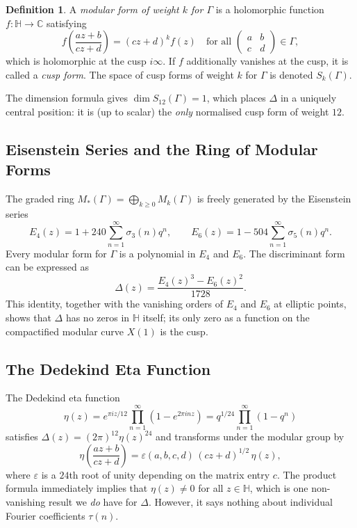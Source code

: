 \documentclass[12pt,a4paper]{amsart}
\theoremstyle{definition}
\newtheorem{definition}[theorem]{Definition}
\begin{document}
\begin{definition}
A \emph{modular form of weight $k$ for $\Gamma$} is a holomorphic function
$f : \mathbb{H} \to \mathbb{C}$ satisfying
\[
  f\!\left(\frac{az+b}{cz+d}\right) = (cz+d)^k f(z)
  \quad \text{for all } \begin{pmatrix}a&b\\c&d\end{pmatrix} \in \Gamma,
\]
which is holomorphic at the cusp $i\infty$. If $f$ additionally vanishes at the
cusp, it is called a \emph{cusp form}. The space of cusp forms of weight $k$ for
$\Gamma$ is denoted $S_k(\Gamma)$.
\end{definition}

The dimension formula gives $\dim S_{12}(\Gamma) = 1$, which places $\Delta$ in a
uniquely central position: it is (up to scalar) the \emph{only} normalised cusp form
of weight $12$.

\subsection{Eisenstein Series and the Ring of Modular Forms}

The graded ring $M_*(\Gamma) = \bigoplus_{k \geq 0} M_k(\Gamma)$ is freely
generated by the Eisenstein series
\[
  E_4(z) = 1 + 240\sum_{n=1}^\infty \sigma_3(n)q^n, \qquad
  E_6(z) = 1 - 504\sum_{n=1}^\infty \sigma_5(n)q^n.
\]
Every modular form for $\Gamma$ is a polynomial in $E_4$ and $E_6$. The
discriminant form can be expressed as
\begin{equation}\label{eq:delta-E4E6}
  \Delta(z) = \frac{E_4(z)^3 - E_6(z)^2}{1728}.
\end{equation}
This identity, together with the vanishing orders of $E_4$ and $E_6$ at elliptic
points, shows that $\Delta$ has no zeros in $\mathbb{H}$ itself; its only
zero as a function on the compactified modular curve $X(1)$ is the cusp.

\subsection{The Dedekind Eta Function}

The Dedekind eta function
\[
  \eta(z) = e^{\pi i z/12} \prod_{n=1}^\infty (1 - e^{2\pi i n z})
  = q^{1/24} \prod_{n=1}^\infty (1 - q^n)
\]
satisfies $\Delta(z) = (2\pi)^{12} \eta(z)^{24}$ and transforms under the modular
group by
\[
  \eta\!\left(\frac{az+b}{cz+d}\right)
  = \varepsilon(a,b,c,d)\,(cz+d)^{1/2}\,\eta(z),
\]
where $\varepsilon$ is a $24$th root of unity depending on the matrix entry $c$.
The product formula immediately implies that $\eta(z) \neq 0$ for all
$z \in \mathbb{H}$, which is one non-vanishing result we \emph{do} have for $\Delta$.
However, it says nothing about individual Fourier coefficients $\tau(n)$.
\end{document}
